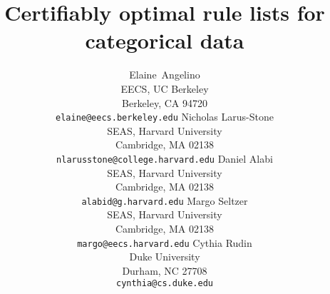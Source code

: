 \documentclass{article}
\title{Certifiably optimal rule lists for categorical data}
\author{
  Elaine~Angelino\\
  EECS, UC Berkeley\\
  Berkeley, CA 94720\\
  \texttt{elaine@eecs.berkeley.edu}
  \And
  Nicholas Larus-Stone\\
  SEAS, Harvard University\\
  Cambridge, MA 02138\\
  \texttt{nlarusstone@college.harvard.edu}
  \And
  Daniel Alabi\\
  SEAS, Harvard University\\
  Cambridge, MA 02138\\
  \texttt{alabid@g.harvard.edu}
  \And
  Margo Seltzer\\
  SEAS, Harvard University\\
  Cambridge, MA 02138\\
  \texttt{margo@eecs.harvard.edu}
  \And
  Cythia Rudin\\
  Duke University\\
  Durham, NC 27708\\
  \texttt{cynthia@cs.duke.edu}
}
\begin{document}

\maketitle

\begin{abstract}

\end{abstract}















\small


\end{document}
